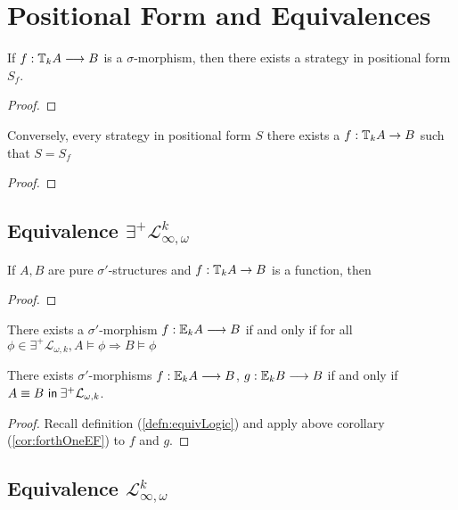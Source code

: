 \section{Positional Form and Equivalences}\label{sec:positionalFormP}
\begin{prop}
If $f:{\mathbb{T}_{k}A} \longrightarrow B$ is a $\sigma$-morphism, then there exists a strategy in positional form $S_{f}$.
\begin{proof}
\end{proof}
\label{prop:fToPosFormP}
\end{prop}
\begin{prop}
Conversely, every strategy in positional form $S$ there exists a $f:{\mathbb{T}_{k}A} \rightarrow B$ such that $S = S_{f}$
\begin{proof}
\end{proof}
\label{prop:posFormToFP}
\end{prop}
\subsection{Equivalence $\exists^{+}\mathcal{L}^{k}_{\infty,\omega}$}
\begin{thm}
If $A,B$ are pure $\sigma'$-structures and $f:{\mathbb{T}_{k}A} \rightarrow B$ is a function, then
\begin{proof}
\end{proof}
\begin{cor}[{\cite{}}]
There exists a $\sigma'$-morphism $f:{\mathbb{E}_{k}A} \longrightarrow B$ if and only if for all $\phi \in \exists^{+}\mathcal{L}_{\omega,k}, A \vDash \phi \Rightarrow B \vDash \phi$
\label{cor:forthOneP}
\end{cor}
\begin{cor}
There exists $\sigma'$-morphisms $f:{\mathbb{E}_{k}A} \longrightarrow B$, $g:{\mathbb{E}_{k}B} \longrightarrow B$ if and only if ${A \equiv B \ \mathsf{in}\: \exists^{+}\mathcal{L}_{\omega,k}}$. 
\begin{proof}
Recall definition (\ref{defn:equivLogic}) and apply above corollary (\ref{cor:forthOneEF}) to $f$ and $g$.  
\end{proof}
\label{cor:forthP}
\end{cor}
\label{thm:toPositionalFormP}
\end{thm}
\subsection{Equivalence $\mathcal{L}^{k}_{\infty,\omega}$}
